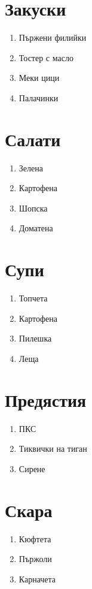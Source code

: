 \documentclass{article}
\begin{document}
\section{Закуски}
\begin{enumerate}
    \item{Пържени филийки}
    \item{Тостер с масло}
    \item{Меки цици}
    \item{Палачинки}
\end{enumerate}

\section{Салати}
\begin{enumerate}
    \item{Зелена}
    \item{Картофена}
    \item{Шопска}
    \item{Доматена}
\end{enumerate}

\section{Супи}
\begin{enumerate}
    \item{Топчета}
    \item{Картофена}
    \item{Пилешка}
    \item{Леща}
\end{enumerate}

\section{Предястия}
\begin{enumerate}
    \item{ПКС}
    \item{Тиквички на тиган}
    \item{Сирене}
\end{enumerate}

\section{Скара}
\begin{enumerate}
    \item{Кюфтета}
    \item{Пържоли}
    \item{Карначета}
\end{enumerate}
\end{document}
